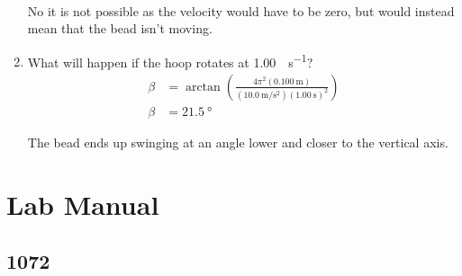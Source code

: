\documentclass{article}
\begin{document}
\begin{enumerate}[label = \textbf{(\alph*)}]
\begin{align*}
		\end{align*}
		\begin{mdframed}
			No it is not possible as the velocity would have to be zero, but would instead mean that the bead isn't moving.
		\end{mdframed}
	\item What will happen if the hoop rotates at \SI{1.00}{\rev \per \second}?
		\begin{align*}
			\beta & = \arctan \left( \frac{ 4\pi^2(\SI{0.100}{\meter}) }{ (\SI{10.0}{\meter \per \second \squared})(\SI{1.00}{\second})^2 } \right) \\
			\beta & = \SI{21.5}{\degree}
		\end{align*}
		\begin{mdframed}
			The bead ends up swinging at an angle lower and closer to the vertical axis.
		\end{mdframed}
\end{enumerate}

\section{Lab Manual}

\subsection{1072}
\end{document}
